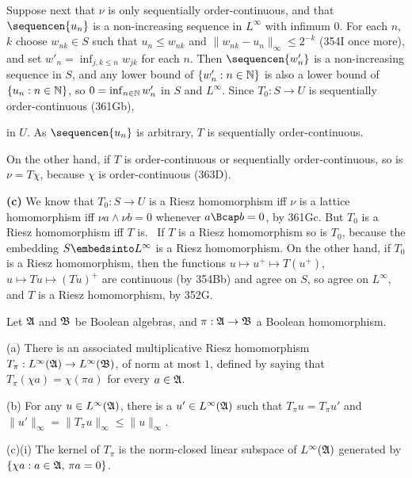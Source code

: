 {\medskip

 Suppose next that $\nu$ is only sequentially
order-continuous, and that $\sequencen{u_n}$ is a non-increasing
sequence in $L^{\infty}$ with infimum $0$.   For each $n$, $k$ choose
$w_{nk}\in S$ such that $u_n\le w_{nk}$ and
$\|w_{nk}-u_n\|_{\infty}\le 2^{-k}$ (354I once more), and set
$w'_n=\inf_{j,k\le n}w_{jk}$ for each
$n$.   Then $\sequencen{w'_n}$ is a non-increasing sequence in $S$, and
any lower bound of $\{w'_n:n\in\Bbb N\}$ is also a lower bound of
$\{u_n:n\in\Bbb N\}$, so $0=\inf_{n\in\Bbb N}w'_n$ in $S$ and
$L^{\infty}$.   Since $T_0:S\to U$ is sequentially order-continuous
(361Gb),


\noindent in $U$.   As $\sequencen{u_n}$ is arbitrary, $T$ is
sequentially order-continuous.

\medskip

 On the other hand, if $T$ is order-continuous or
sequentially order-continuous, so is $\nu=T\chi$, because $\chi$ is
order-continuous (363D).

\medskip

{\bf (c)} We know that $T_0:S\to U$ is a Riesz homomorphism iff $\nu$ is
a lattice homomorphism iff $\nu a\wedge\nu b=0$ whenever $a\Bcap b=0$,
by 361Gc.   But $T_0$ is a Riesz homomorphism iff $T$ is.   \Prf\ If $T$
is a Riesz homomorphism so is $T_0$, because the embedding
$S\embedsinto L^{\infty}$ is a Riesz homomorphism.   On the other hand, if
$T_0$ is a
Riesz homomorphism, then the functions $u\mapsto u^+\mapsto T(u^+)$,
$u\mapsto Tu\mapsto (Tu)^+$ are continuous (by 354Bb) and agree on $S$,
so agree on
$L^{\infty}$, and $T$ is a Riesz homomorphism, by 352G.\ \Qed
}%

 Let $\frak A$ and $\frak B$ be Boolean algebras,
and $\pi:\frak A\to\frak B$ a Boolean homomorphism.

(a) There is an associated multiplicative Riesz homomorphism
$T_{\pi}:L^{\infty}(\frak A)\to L^{\infty}(\frak B)$, of norm at most
$1$, defined by saying that $T_{\pi}(\chi a)=\chi(\pi a)$ for every
$a\in\frak A$.

(b) For any $u\in L^{\infty}(\frak A)$, there is a
$u'\in L^{\infty}(\frak A)$ such that $T_{\pi}u=T_{\pi}u'$ and
$\|u'\|_{\infty}=\|T_{\pi}u\|_{\infty}\le\|u\|_{\infty}$.

(c)(i) The kernel of $T_{\pi}$ is the norm-closed linear subspace of
$L^{\infty}(\frak A)$ generated by $\{\chi a:a\in\frak A,\,\pi a=0\}$.

